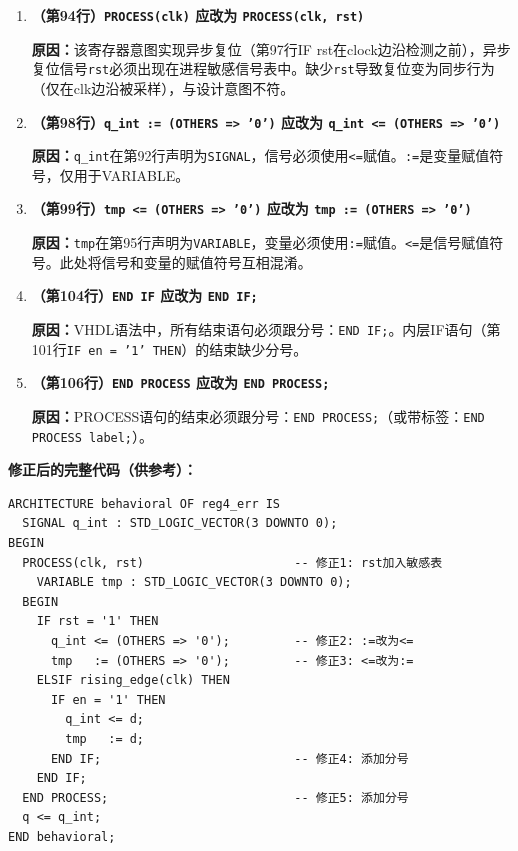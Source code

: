 \begin{enumerate}[label=\textbf{错误\arabic*：}]

\item \textbf{（第94行）\texttt{PROCESS(clk)} 应改为 \texttt{PROCESS(clk, rst)}}

\textbf{原因：}该寄存器意图实现异步复位（第97行IF rst在clock边沿检测之前），异步复位信号\texttt{rst}必须出现在进程敏感信号表中。缺少\texttt{rst}导致复位变为同步行为（仅在clk边沿被采样），与设计意图不符。

\item \textbf{（第98行）\texttt{q\_int := (OTHERS => '0')} 应改为 \texttt{q\_int <= (OTHERS => '0')}}

\textbf{原因：}\texttt{q\_int}在第92行声明为\texttt{SIGNAL}，信号必须使用\texttt{<=}赋值。\texttt{:=}是变量赋值符号，仅用于VARIABLE。

\item \textbf{（第99行）\texttt{tmp <= (OTHERS => '0')} 应改为 \texttt{tmp := (OTHERS => '0')}}

\textbf{原因：}\texttt{tmp}在第95行声明为\texttt{VARIABLE}，变量必须使用\texttt{:=}赋值。\texttt{<=}是信号赋值符号。此处将信号和变量的赋值符号互相混淆。

\item \textbf{（第104行）\texttt{END IF} 应改为 \texttt{END IF;}}

\textbf{原因：}VHDL语法中，所有结束语句必须跟分号：\texttt{END IF;}。内层IF语句（第101行\texttt{IF en = '1' THEN}）的结束缺少分号。

\item \textbf{（第106行）\texttt{END PROCESS} 应改为 \texttt{END PROCESS;}}

\textbf{原因：}PROCESS语句的结束必须跟分号：\texttt{END PROCESS;}（或带标签：\texttt{END PROCESS label;}）。

\end{enumerate}

\begin{framed}
\textbf{修正后的完整代码（供参考）：}
\begin{lstlisting}[language=VDL]
ARCHITECTURE behavioral OF reg4_err IS
  SIGNAL q_int : STD_LOGIC_VECTOR(3 DOWNTO 0);
BEGIN
  PROCESS(clk, rst)                     -- 修正1: rst加入敏感表
    VARIABLE tmp : STD_LOGIC_VECTOR(3 DOWNTO 0);
  BEGIN
    IF rst = '1' THEN
      q_int <= (OTHERS => '0');         -- 修正2: :=改为<=
      tmp   := (OTHERS => '0');         -- 修正3: <=改为:=
    ELSIF rising_edge(clk) THEN
      IF en = '1' THEN
        q_int <= d;
        tmp   := d;
      END IF;                           -- 修正4: 添加分号
    END IF;
  END PROCESS;                          -- 修正5: 添加分号
  q <= q_int;
END behavioral;
\end{lstlisting}
\end{framed}

